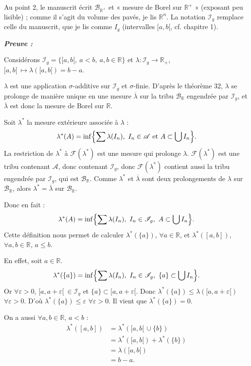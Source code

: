 \documentclass[11pt,a4paper]{article}
\newcommand{\R}{\mathbb{R}}
\newcommand{\A}{\mathscr{A}}
\newcommand{\B}{\mathscr{B}}
\newcommand{\Ff}{\mathscr{F}}
\newcommand{\Ii}{\mathscr{I}}
\newenvironment{preuve}{\par\textit{\textbf{Preuve :}}\par\nopagebreak[4]}{\par}
\begin{document}
\begin{note}
Au point 2, le manuscrit écrit $\B_{\R^+}$ et « mesure de Borel sur $\R^{+}$ » (exposant peu lisible) ; comme il s'agit du volume des pavés, je lis $\R^n$.
La notation $\Ii_g$ remplace celle du manuscrit, que je lis comme $I_g$ (intervalles $[a,b[$, cf. chapitre 1).
\end{note}

\begin{preuve}
Considérons $\Ii_g=\{[a,b[,\ a<b,\ a,b\in\R\}$ et $\lambda:\Ii_g\to\R_+$, $[a,b[\ \longmapsto\lambda([a,b[)=b-a$.

$\lambda$ est une application $\sigma$-additive sur $\Ii_g$ et $\sigma$-finie. D'après le théorème 32, $\lambda$ se prolonge de manière unique en une mesure
$\overline{\lambda}$ sur la tribu $\B_{\R}$ engendrée par $\Ii_g$, et $\overline{\lambda}$ est donc la mesure de Borel sur $\R$.

Soit $\lambda^*$ la mesure extérieure associée à $\lambda$ :
\[
  \lambda^*(A)=\inf\Bigl\{\sum\lambda(I_n),\ I_n\in\A\ \text{et}\ A\subset\bigcup I_n\Bigr\}.
\]
La restriction de $\lambda^*$ à $\Ff(\lambda^*)$ est une mesure qui prolonge $\lambda$. $\Ff(\lambda^*)$ est une tribu contenant $\A$, donc contenant $\Ii_g$, donc $\Ff(\lambda^*)$ contient aussi la tribu engendrée par $\Ii_g$, qui est $\B_{\R}$.
Comme $\lambda^*$ et $\overline{\lambda}$ sont deux prolongements de $\lambda$ sur $\B_{\R}$, alors $\lambda^*=\overline{\lambda}$ sur $\B_{\R}$.

Donc en fait :
\[
  \lambda^*(A)=\inf\Bigl\{\sum\lambda(I_n),\ I_n\in\Ii_g,\ A\subset\bigcup I_n\Bigr\}.
\]
Cette définition nous permet de calculer $\lambda^*(\{a\})$, $\forall a\in\R$, et $\lambda^*([a,b])$, $\forall a,b\in\R$, $a\le b$.

En effet, soit $a\in\R$.
\[
  \lambda^*(\{a\})=\inf\Bigl\{\sum\lambda(I_n),\ I_n\in\Ii_g,\ \{a\}\subset\bigcup I_n\Bigr\}.
\]
Or $\forall\varepsilon>0$, $[a,a+\varepsilon[\ \in\Ii_g$ et $\{a\}\subset[a,a+\varepsilon[$.
Donc $\lambda^*(\{a\})\le\lambda([a,a+\varepsilon[)$ $\forall\varepsilon>0$. D'où $\lambda^*(\{a\})\le\varepsilon$ $\forall\varepsilon>0$.
Il vient que $\lambda^*(\{a\})=0$.

On a aussi $\forall a,b\in\R$, $a<b$ :
\begin{align*}
  \lambda^*([a,b])&=\lambda^*([a,b[\,\cup\{b\})\\
  &=\lambda^*([a,b[)+\lambda^*(\{b\})\\
  &=\lambda([a,b[)\\
  &=b-a.
\end{align*}
\end{preuve}
\end{document}
